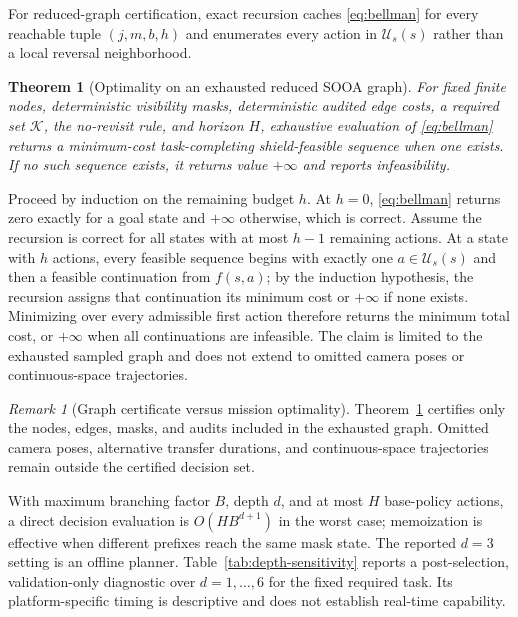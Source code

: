 \documentclass{IEEEtaes}
\newtheorem{theorem}{Theorem}
\theoremstyle{remark}
\newtheorem{remark}{Remark}
\theoremstyle{plain}
\begin{document}
For reduced-graph certification, exact recursion caches \eqref{eq:bellman} for every reachable tuple $(j,m,b,h)$ and enumerates every action in $\mathcal U_s(s)$ rather than a local reversal neighborhood.

\begin{theorem}[Optimality on an exhausted reduced SOOA graph]
\label{thm:reduced-optimality}
For fixed finite nodes, deterministic visibility masks, deterministic audited edge costs, a required set $\mathcal K$, the no-revisit rule, and horizon $H$, exhaustive evaluation of \eqref{eq:bellman} returns a minimum-cost task-completing shield-feasible sequence when one exists. If no such sequence exists, it returns value $+\infty$ and reports infeasibility.
\end{theorem}

\begin{IEEEproof}
Proceed by induction on the remaining budget $h$. At $h=0$, \eqref{eq:bellman} returns zero exactly for a goal state and $+\infty$ otherwise, which is correct. Assume the recursion is correct for all states with at most $h-1$ remaining actions. At a state with $h$ actions, every feasible sequence begins with exactly one $a\in\mathcal U_s(s)$ and then a feasible continuation from $f(s,a)$; by the induction hypothesis, the recursion assigns that continuation its minimum cost or $+\infty$ if none exists. Minimizing over every admissible first action therefore returns the minimum total cost, or $+\infty$ when all continuations are infeasible. The claim is limited to the exhausted sampled graph and does not extend to omitted camera poses or continuous-space trajectories.
\end{IEEEproof}

\begin{remark}[Graph certificate versus mission optimality]
Theorem~\ref{thm:reduced-optimality} certifies only the nodes, edges, masks, and audits included in the exhausted graph. Omitted camera poses, alternative transfer durations, and continuous-space trajectories remain outside the certified decision set.
\end{remark}

With maximum branching factor $B$, depth $d$, and at most $H$ base-policy actions, a direct decision evaluation is $O(HB^{d+1})$ in the worst case; memoization is effective when different prefixes reach the same mask state. The reported $d=3$ setting is an offline planner. Table~\ref{tab:depth-sensitivity} reports a post-selection, validation-only diagnostic over $d=1,\ldots,6$ for the fixed required task. Its platform-specific timing is descriptive and does not establish real-time capability.
\end{document}
